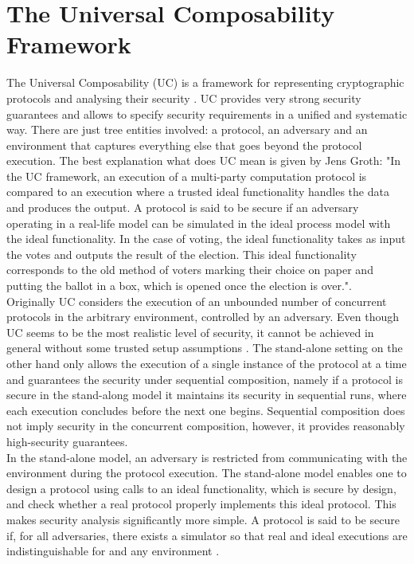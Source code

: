  \section{The Universal Composability Framework}
 \label{uc}
The Universal Composability (UC) is a framework for representing cryptographic protocols and analysing their security \cite{Canetti2001}. UC provides very  strong security guarantees and allows to specify security requirements in a unified and systematic way. There are just tree entities involved: a protocol, an adversary and an environment that captures everything else that goes beyond the protocol execution. The best explanation what does UC mean is given by Jens Groth: "In the UC framework, an execution of a multi-party computation protocol is compared to an execution where a trusted ideal functionality handles the data and produces the output. A protocol is said to be secure if an adversary operating in a real-life model can be simulated in the ideal process model with the ideal functionality. In the case of voting, the ideal functionality takes as input the votes and outputs the result of the election. This ideal functionality corresponds to the old method of voters marking their choice on paper and putting the ballot in a box, which is opened once the election is over."\cite{Groth2004}.\\

Originally UC considers the execution of an unbounded number of concurrent protocols in the arbitrary environment, controlled by an adversary. Even though UC seems to be the most realistic level of security, it cannot be achieved in general without some trusted setup assumptions \cite{Lin2009}. The stand-alone setting on the other hand only allows the execution of a single instance of the protocol at a time and guarantees the security under sequential composition, namely if a protocol is secure in the stand-along model it maintains its security in sequential runs, where each execution concludes before the next one begins.  Sequential composition does not imply security in the concurrent composition, however, it provides reasonably high-security guarantees.\\ 

In the stand-alone model, an adversary is restricted from communicating with the environment during the protocol execution. The stand-alone model enables one to design a protocol using calls to an ideal functionality, which is secure by design,  and check whether a real protocol properly implements this ideal protocol. This makes security analysis significantly more simple. A protocol is said to be secure if, for all adversaries, there exists a simulator so that real and ideal executions are indistinguishable for and any environment \cite{Lindell2016}. 
